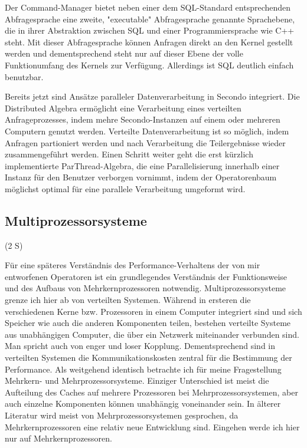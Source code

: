 \documentclass[a4paper,12pt,twoside]{article}
\begin{document}
Der Command-Manager bietet neben einer dem SQL-Standard entsprechenden Abfragesprache eine zweite, "executable" Abfragesprache genannte Sprachebene, die in ihrer Abstraktion zwischen SQL und einer Programmiersprache wie C++ steht.  Mit dieser Abfragesprache können Anfragen direkt an den Kernel gestellt werden und dementsprechend steht nur auf dieser Ebene der volle Funktionumfang des Kernels zur Verfügung. Allerdings ist SQL deutlich einfach benutzbar. 
 
Bereits jetzt sind Ansätze paralleler Datenverarbeitung in Secondo integriert. Die Distributed Algebra ermöglicht eine Verarbeitung eines verteilten Anfrageprozesses, indem mehre Secondo-Instanzen auf einem oder mehreren Computern genutzt werden. Verteilte Datenverarbeitung ist so möglich, indem Anfragen partioniert werden und nach Verarbeitung die Teilergebnisse wieder zusammengeführt werden. Einen Schritt weiter geht die erst kürzlich implementierte ParThread-Algebra, die eine Parallelisierung innerhalb einer Instanz für den Benutzer verborgen vornimmt, indem der Operatorenbaum möglichst optimal für eine parallele Verarbeitung umgeformt wird.

\subsection{Multiprozessorsysteme} (2 S)

Für eine späteres Verständnis des Performance-Verhaltens der von mir entworfenen Operatoren ist ein grundlegendes Verständnis der Funktionsweise und des Aufbaus von Mehrkernprozessoren notwendig. Multiprozessorsysteme grenze ich hier ab von verteilten Systemen. Während in ersteren die verschiedenen Kerne bzw. Prozessoren in einem Computer integriert sind und sich Speicher wie auch die anderen Komponenten teilen, bestehen verteilte Systeme aus unabhängigen Computer, die über ein Netzwerk miteinander verbunden sind. Man spricht auch von enger und loser Kopplung. Dementsprechend sind in verteilten Systemen die Kommunikationskosten zentral für die Bestimmung der Performance. Als weitgehend identisch betrachte ich für meine Fragestellung Mehrkern- und Mehrprozessorsysteme. Einziger Unterschied ist meist die Aufteilung des Caches auf mehrere Prozessoren bei Mehrprozessorsystemen, aber auch einzelne Komponenten können unabhängig voneinander sein. In älterer Literatur wird meist von Mehrprozessorsystemen gesprochen, da Mehrkernprozessoren eine relativ neue Entwicklung sind. Eingehen werde ich hier nur auf Mehrkernprozessoren.
\end{document}
